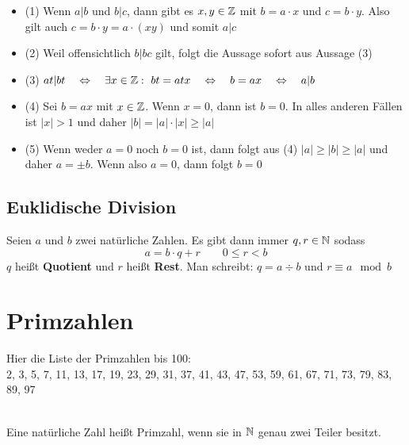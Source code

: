 \begin{Beweis}
\begin{itemize}
\item (1) \quad Wenn $a|b$ und $b|c$, dann gibt es $x,y\in\mathbb{Z}$ mit $b=a\cdot x$ und $c=b\cdot y$. Also gilt auch $c=b\cdot y=a\cdot(xy)$ und somit $a|c$\\ 
\item (2) \quad Weil offensichtlich $b|bc$ gilt, folgt die Aussage sofort aus Aussage (3) \\
\item (3)  \quad $at|bt\quad \Leftrightarrow\quad \exists x \in \mathbb{Z} : \, \, bt=atx \quad\Leftrightarrow \quad b=ax \quad\Leftrightarrow \quad a|b$ \\
\item (4) \quad Sei $b=ax$ mit $x\in\mathbb{Z}$. Wenn $x=0$, dann ist $b=0$. In alles anderen Fällen ist $|x|>1$ und daher $|b| = |a| \cdot |x| \geq |a|$ 
\item (5) \quad Wenn weder $a=0$ noch $b=0$ ist, dann folgt aus (4) $|a|\geq|b|\geq|a|$ und daher $a=\pm b$. Wenn also  $a=0$, dann folgt $b=0$
\end{itemize}
\end{Beweis}

	\subsection{Euklidische Division}

\begin{Definition}
Seien $a$ und $b$ zwei natürliche Zahlen. Es gibt dann immer $q,r \in \mathbb{N}$ sodass 
$$a= b\cdot q + r \qquad 0\leq r < b$$
$q$ heißt \textbf{Quotient} und $r$  heißt \textbf{Rest}.
Man schreibt: \qquad $q=a \div b$ \qquad und \qquad $r \equiv a \mod b$
\end{Definition}

	\section{Primzahlen}

Hier die Liste der Primzahlen bis 100: \\

2,     3,     5,     7,    11,    13,    17,    19,    23,    29,    31,    37,    41,    43,    47,    53,    59,    61,    67,    71,    73,    79,    83,    89,    97\\\\

\begin{Definition}
Eine natürliche Zahl heißt Primzahl, wenn sie in $\mathbb{N}$ genau zwei Teiler besitzt. 
\end{Definition}


